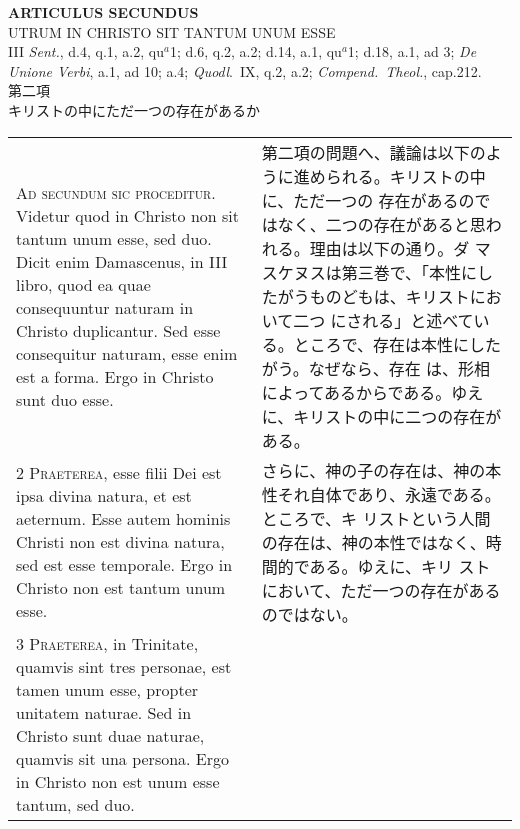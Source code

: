 \documentclass[10pt]{jsarticle} %
\begin{document}
\newpage


\begin{center}
 {\Large {\bf ARTICULUS SECUNDUS}}\\
 {\large UTRUM IN CHRISTO SIT TANTUM UNUM ESSE}\\
 {\footnotesize III {\itshape Sent.}, d.4, q.1, a.2, qu$^a$1; d.6, q.2, a.2;
 d.14, a.1, qu$^a$1; d.18, a.1, ad 3; {\itshape De Unione Verbi}, a.1,
 ad 10; a.4; {\itshape Quodl}.~IX, q.2, a.2; {\itshape Compend.~Theol.},
 cap.212.}\\
 {\Large 第二項\\キリストの中にただ一つの存在があるか}
\end{center}

\begin{longtable}{p{21em}p{21em}}

{\Huge A}{\scshape d secundum sic proceditur}. Videtur quod
 in Christo non sit tantum unum esse, sed duo. Dicit enim Damascenus, in
 III libro, quod ea quae consequuntur naturam in Christo
 duplicantur. Sed esse consequitur naturam, esse enim est a forma. Ergo
 in Christo sunt duo esse.


&

第二項の問題へ、議論は以下のように進められる。キリストの中に、ただ一つの
 存在があるのではなく、二つの存在があると思われる。理由は以下の通り。ダ
 マスケヌスは第三巻で、「本性にしたがうものどもは、キリストにおいて二つ
 にされる」と述べている。ところで、存在は本性にしたがう。なぜなら、存在
 は、形相によってあるからである。ゆえに、キリストの中に二つの存在がある。


\\



{\scshape 2 Praeterea}, esse filii Dei est ipsa divina
 natura, et est aeternum. Esse autem hominis Christi non est divina
 natura, sed est esse temporale. Ergo in Christo non est tantum unum
 esse.


&

さらに、神の子の存在は、神の本性それ自体であり、永遠である。ところで、キ
 リストという人間の存在は、神の本性ではなく、時間的である。ゆえに、キリ
 ストにおいて、ただ一つの存在があるのではない。


\\



{\scshape 3 Praeterea}, in Trinitate, quamvis sint
 tres personae, est tamen unum esse, propter unitatem naturae. Sed in
 Christo sunt duae naturae, quamvis sit una persona. Ergo in Christo non
 est unum esse tantum, sed duo.



\end{longtable}
\end{document}
